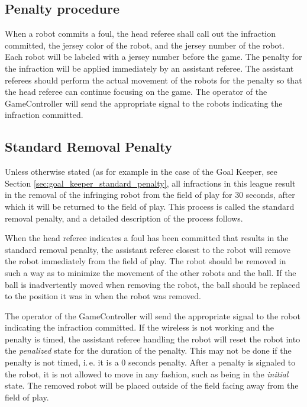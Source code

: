 \documentclass[12pt]{article}
\newcommand{\ie}{\mbox{i.\,e.}\xspace}
\begin{document}
\subsection{Penalty procedure}
\label{sec:penalty_procedure}

When a robot commits a foul, the head referee shall call out the infraction committed, the jersey color of the robot, and the jersey number of the robot. Each robot will be labeled with a jersey number before the game. The penalty for the infraction will be applied immediately by an assistant referee. The assistant referees should perform the actual movement of the robots for the penalty so that the head referee can continue focusing on the game. The operator of the GameController will send the appropriate signal to the robots indicating the infraction committed.

\subsection{Standard Removal Penalty}
\label{sec:removal_penalty}

Unless otherwise stated (as for example in the case of the Goal Keeper, see Section \ref{sec:goal_keeper_standard_penalty}, all infractions in this league result in the removal of the infringing robot from the field of play for 30 seconds, after which it will be returned to the field of play. This process is called the standard removal penalty, and a detailed description of the process follows.

When the head referee indicates a foul has been committed that results in the standard removal penalty, the assistant referee closest to the robot will remove the robot immediately from the field of play. The robot should be removed in such a way as to minimize the movement of the other robots and the ball. If the ball is inadvertently moved when removing the robot, the ball should be replaced to the position it was in when the robot was removed.

The operator of the GameController will send the appropriate signal to the robot indicating the infraction committed. If the wireless is not working and the penalty is timed, the assistant referee handling the robot will reset the robot into the \emph{penalized} state for the duration of the penalty. This may not be done if the penalty is not timed, \ie it is a 0 seconds penalty. After a penalty is signaled to the robot, it is not allowed to move in any fashion, such as being in the \emph{initial} state. The removed robot will be placed outside of the field facing away from the field of play.
\end{document}

